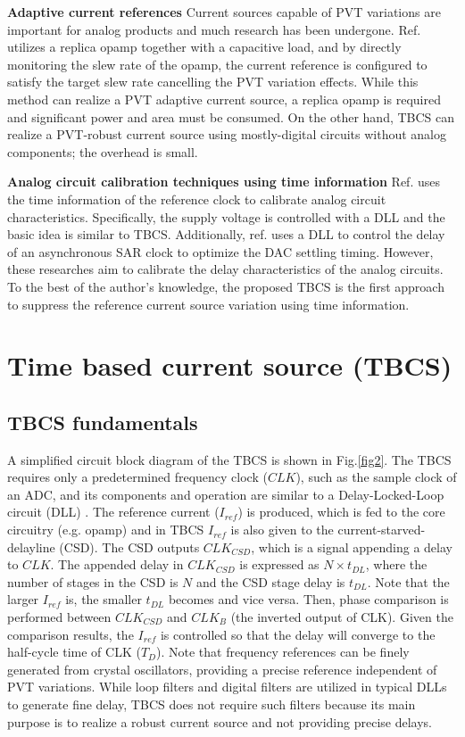 \documentclass[paper]{ieice}
\begin{document}
\textbf{Adaptive current references} Current sources capable of PVT variations are important for analog products and much research has been undergone. Ref.\cite{chuanyang,ron} utilizes a replica opamp together with a capacitive load, and by directly monitoring the slew rate of the opamp, the current reference is configured to satisfy the target slew rate cancelling the PVT variation effects.
While this method can realize a PVT adaptive current source, a replica opamp is required and significant power and area must be consumed. On the other hand, TBCS can realize a PVT-robust current source using mostly-digital circuits without analog components; the overhead is small.

\textbf{Analog circuit calibration techniques using time information} Ref.\cite{zhu} uses the time information of the reference clock to calibrate analog circuit characteristics. Specifically, the supply voltage is controlled with a DLL and the basic idea is similar to TBCS. Additionally, ref.\cite{kapusta201314b,tompson} uses a DLL to control the delay of an asynchronous SAR clock to optimize the DAC settling timing.
However, these researches aim to calibrate the delay characteristics of the analog circuits. To the best of the author's knowledge, the proposed TBCS is the first approach to suppress the reference current source variation using time information.

\section{Time based current source (TBCS)}
\subsection{TBCS fundamentals}
A simplified circuit block diagram of the TBCS is shown in Fig.\ref{fig2}. The TBCS requires only a  predetermined frequency clock ($CLK$), such as the sample clock of an ADC, and its components and operation are similar to a Delay-Locked-Loop circuit (DLL) \cite{ sidiropoulos1997semidigital, lee19942, razavi2018delay}. The reference current ($I_{ref}$) is produced, which is fed to the core circuitry (e.g. opamp) and in TBCS $I_{ref}$ is also given to the current-starved-delayline (CSD). The CSD outputs $CLK_{CSD}$, which is a signal appending a delay to $CLK$. The appended delay in $CLK_{CSD}$ is expressed as $N \times t_{DL}$, where the number of stages in the CSD is $N$ and the CSD stage delay is $t_{DL}$. Note that the larger $I_{ref}$ is, the smaller $t_{DL}$ becomes and vice versa. 
Then, phase comparison is performed between $CLK_{CSD}$ and $CLK_B$ (the inverted output of CLK). Given the comparison results, the $I_{ref}$ is controlled so that the delay will converge to the half-cycle time of CLK ($T_D$). Note that frequency references can be finely generated from crystal oscillators, providing a precise reference independent of PVT variations. While loop filters \cite{sidiropoulos1997semidigital} and digital filters \cite{kim20172} are utilized in typical DLLs to generate fine delay, TBCS does not require such filters because its main purpose is to realize a robust current source and not providing precise delays.
\end{document}
